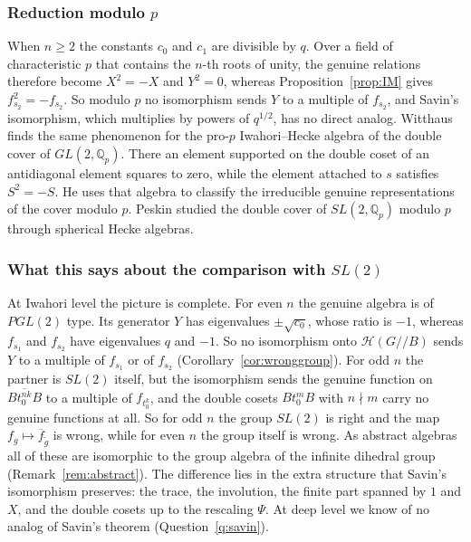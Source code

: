 \documentclass[12pt,letterpaper]{amsart}
\numberwithin{equation}{section}
\theoremstyle{definition}
\theoremstyle{remark}
\newcommand{\cH}{\mathcal{H}}
\newcommand{\fbar}{\overline{f}}
\begin{document}
\subsubsection{Reduction modulo \texorpdfstring{$p$}{p}}
When $n\geq 2$ the constants $c_0$ and $c_1$ are divisible by $q$. Over
a field of characteristic $p$ that contains the $n$-th roots of unity,
the genuine relations therefore become $X^2=-X$ and $Y^2=0$, whereas
Proposition~\ref{prop:IM} gives $f_{s_2}^2=-f_{s_2}$. So modulo $p$ no
isomorphism sends $Y$ to a multiple of $f_{s_2}$, and Savin's
isomorphism, which multiplies by powers of $q^{1/2}$, has no direct
analog. Witthaus \cite[Proposition~3.33]{Wi22} finds the same
phenomenon for the pro-$p$ Iwahori--Hecke algebra of the double cover
of $GL(2,\mathbb{Q}_p)$. There an element supported on the double
coset of an antidiagonal element squares to zero, while the element
attached to $s$ satisfies $S^2=-S$. He uses that algebra to classify the
irreducible genuine representations of the cover modulo $p$. Peskin
\cite{Pe14} studied the double cover of $SL(2,\mathbb{Q}_p)$ modulo $p$
through spherical Hecke algebras.

\subsubsection{What this says about the comparison with \texorpdfstring{$SL(2)$}{SL(2)}}
At Iwahori level the picture is complete. For even $n$ the genuine
algebra is of $PGL(2)$ type. Its generator $Y$ has eigenvalues
$\pm\sqrt{c_0}$, whose ratio is $-1$, whereas $f_{s_1}$ and $f_{s_2}$
have eigenvalues $q$ and $-1$. So no isomorphism onto $\cH(G/\!/B)$
sends $Y$ to a multiple of $f_{s_1}$ or of $f_{s_2}$
(Corollary~\ref{cor:wronggroup}). For odd $n$ the partner is $SL(2)$
itself, but the isomorphism sends the genuine function on
$\overline{Bt_0^{nk}B}$ to a multiple of $f_{t_0^k}$, and the double
cosets $Bt_0^mB$ with $n\nmid m$ carry no genuine functions at all. So
for odd $n$ the group $SL(2)$ is right and the map
$f_g\mapsto\fbar_{\tilde g}$ is wrong, while for even $n$ the group
itself is wrong. As abstract algebras all of these are isomorphic to the
group algebra of the infinite dihedral group
(Remark~\ref{rem:abstract}). The difference lies in the extra structure
that Savin's isomorphism preserves: the trace, the involution, the
finite part spanned by $1$ and $X$, and the double cosets up to the
rescaling $\Psi$. At deep level we know of no analog of Savin's theorem
(Question~\ref{q:savin}).
\end{document}
